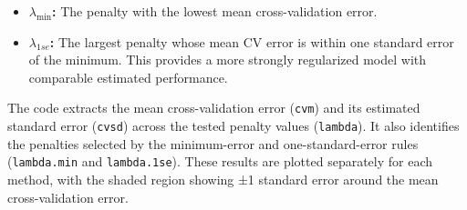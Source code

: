 \documentclass[
  letterpaper,
  DIV=11,
  numbers=noendperiod]{scrreprt}
\providecommand{\tightlist}{%
  \setlength{\itemsep}{0pt}\setlength{\parskip}{0pt}}
\begin{document}
\begin{itemize}
\tightlist
\item
  \textbf{\(\lambda_{\min}\):} The penalty with the lowest mean
  cross-validation error.
\item
  \textbf{\(\lambda_{1se}\):} The largest penalty whose mean CV error is
  within one standard error of the minimum. This provides a more
  strongly regularized model with comparable estimated performance.
\end{itemize}

The code extracts the mean cross-validation error (\texttt{cvm}) and its
estimated standard error (\texttt{cvsd}) across the tested penalty
values (\texttt{lambda}). It also identifies the penalties selected by
the minimum-error and one-standard-error rules (\texttt{lambda.min} and
\texttt{lambda.1se}). These results are plotted separately for each
method, with the shaded region showing ±1 standard error around the mean
cross-validation error.
\end{document}
